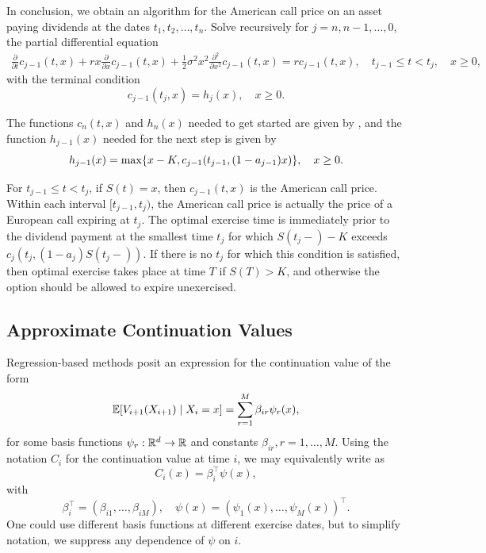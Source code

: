 In conclusion, we obtain an algorithm for the American call price on an asset paying dividends at the dates \(t_1, t_2, \dots, t_n\). Solve recursively for \(j = n, n-1, \dots, 0\), the partial differential equation
\begin{equation}
	\begin{split}
		\frac{\partial}{\partial t}c_{j-1}(t, x)
		+ rx \frac{\partial}{\partial x}c_{j-1}(t, x)
		+ \frac{1}{2}\sigma^2 x^2 \frac{\partial^2}{\partial x^2}c_{j-1}(t, x)
		= r c_{j-1}(t, x), \quad t_{j-1} \le t < t_j, \quad x \ge 0,
	\end{split}
	\label{eq:AmericanCallRecursionPDE}
\end{equation}
with the terminal condition
\begin{equation}
	c_{j-1}(t_j, x) = h_j(x), \quad x \ge 0.
	\label{eq:AmericanCallRecursionTerminal}
\end{equation}

The functions \(c_n(t, x)\) and \(h_n(x)\) needed to get started are given by , and the function \(h_{j-1}(x)\) needed for the next step is given by
\begin{equation}
	h_{j-1}(x) = \max \{ x - K, c_{j-1}(t_{j-1}, (1 - a_{j-1})x) \}, \quad x \ge 0.
	\label{eq:HJMinusOneDefinition}
\end{equation}

For \(t_{j-1} \le t < t_j\), if \(S(t) = x\), then \(c_{j-1}(t, x)\) is the American call price. Within each interval \([t_{j-1}, t_j)\), the American call price is actually the price of a European call expiring at \(t_j\). The optimal exercise time is immediately prior to the dividend payment at the smallest time \(t_j\) for which \(S(t_j-) - K\) exceeds \(c_j(t_j, (1 - a_j)S(t_j-))\). If there is no \(t_j\) for which this condition is satisfied, then optimal exercise takes place at time \(T\) if \(S(T) > K\), and otherwise the option should be allowed to expire unexercised.

\subsection{Approximate Continuation Values}
Regression-based methods posit an expression for the continuation value of the form
\begin{equation} \label{eq:ContinuationValueExpectation}
	\mathbb{E}[V_{i+1}(X_{i+1}) \mid X_i = x] = \sum_{r=1}^M \beta_{ir} \psi_r(x),
\end{equation}
for some basis functions \(\psi_r : \mathbb{R}^d \to \mathbb{R}\) and constants \(\beta_{ir}, r = 1, \dots, M\). Using the notation \(C_i\) for the continuation value at time \(i\), we may equivalently write  as
\begin{equation} \label{eq:ContinuationValueVectorForm}
	C_i(x) = \beta_i^\top \psi(x),
\end{equation}
with
\begin{equation*}
	\beta_i^\top = (\beta_{i1}, \dots, \beta_{iM}), \quad \psi(x) = (\psi_1(x), \dots, \psi_M(x))^\top.
\end{equation*}
One could use different basis functions at different exercise dates, but to simplify notation, we suppress any dependence of \(\psi\) on \(i\).

